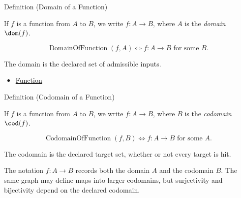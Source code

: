\begin{definitionbox}{Definition (Domain of a Function)}
\begin{definition}\label{def:domain}
If $f$ is a function from $A$ to $B$, we write $f : A \to B$, where $A$ is
the \emph{domain} $\dom(f)$.
\end{definition}
\end{definitionbox}

\begin{remark*}
\[
  \operatorname{DomainOfFunction}(f,A)
  \iff
  f:A\to B\text{ for some }B.
\]
\end{remark*}

\begin{remark*}[Interpretation]
The domain is the declared set of admissible inputs.
\end{remark*}

\begin{dependencies}
\begin{itemize}
  \item \hyperref[def:function]{Function}
\end{itemize}
\end{dependencies}

\begin{definitionbox}{Definition (Codomain of a Function)}
\begin{definition}\label{def:codomain}
If $f$ is a function from $A$ to $B$, we write $f : A \to B$, where $B$ is
the \emph{codomain} $\cod(f)$.
\end{definition}
\end{definitionbox}

\begin{remark*}
\[
  \operatorname{CodomainOfFunction}(f,B)
  \iff
  f:A\to B\text{ for some }A.
\]
\end{remark*}

\begin{remark*}[Interpretation]
The codomain is the declared target set, whether or not every target is hit.
\end{remark*}

\begin{remark*}[Exposition]
The notation $f:A\to B$ records both the domain $A$ and the codomain $B$.
The same graph may define maps into larger codomains, but surjectivity and
bijectivity depend on the declared codomain.
\end{remark*}

